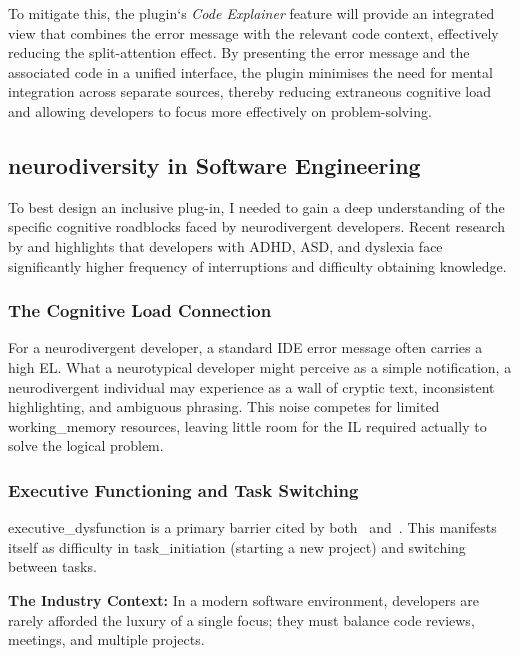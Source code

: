 To mitigate this, the plugin`s \textit{Code Explainer} feature will provide an integrated view that combines the error message with the relevant code context, effectively 
reducing the split-attention effect. By presenting the error message and the associated code in a unified interface, the plugin minimises the need for mental integration
 across separate sources, thereby reducing extraneous cognitive load and allowing developers to focus more effectively on problem-solving.


\subsection{\Gls{neurodiversity} in Software Engineering}
To best design an inclusive plug-in, I needed to gain a deep understanding of the specific cognitive roadblocks faced by \gls{neurodivergent}
 developers. Recent research by \textcite{verma2025differences} and \textcite{gama2025socio} highlights that developers with \gls{ADHD}, 
 \gls{ASD}, and \gls{dyslexia} face significantly higher frequency of interruptions and difficulty obtaining knowledge.

\subsubsection{The Cognitive Load Connection}

For a \gls{neurodivergent} developer, a standard \gls{IDE} error message often carries a high \gls{EL}. What a neurotypical developer
 might perceive as a simple notification, a \gls{neurodivergent} individual may experience as a wall of cryptic text, inconsistent highlighting, 
 and ambiguous phrasing. This noise competes for limited \gls{working_memory} resources, leaving little room for the \gls{IL} required actually 
 to solve the logical problem.

\subsubsection{Executive Functioning and Task Switching}

\Gls{executive_dysfunction} is a primary barrier cited by both~\textcite{verma2025differences} and~\textcite{gama2025socio}. This manifests
 itself as difficulty in \gls{task_initiation} (starting a new project) and switching between tasks.

\textbf{The Industry Context:} In a modern software environment, developers are rarely afforded the luxury of a single focus; they must
 balance code reviews, meetings, and multiple projects.

